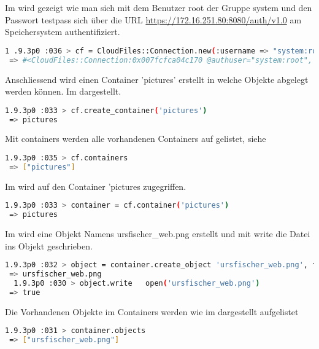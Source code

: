 Im  wird gezeigt wie man sich mit dem Benutzer root der Gruppe system und den Passwort testpass sich über die URL \url{https://172.16.251.80:8080/auth/v1.0} am Speichersystem authentifiziert.

\begin{lstlisting}[label=logon, language=Bash, caption=Anmelden an Speichersystem] 
 1 .9.3p0 :036 > cf = CloudFiles::Connection.new(:username => "system:root", :api_key => "testpass", :auth_url => "https://172.16.251.80:8080/auth/v1.0")
 => #<CloudFiles::Connection:0x007fcfca04c170 @authuser="system:root", @authkey="testpass", @auth_url="https://172.16.251.80:8080/auth/v1.0", @retry_auth=true, @snet=nil, @proxy_host=nil, @proxy_port=nil, @authok=true, @http={}, @storagehost="172.16.251.80", @storagepath="/v1/AUTH_system", @storageport=8080, @storagescheme="https", @authtoken="AUTH_tk4bc3d45cef364606ad521708101ad574"> 
\end{lstlisting}

Anschliessend wird einen Container 'pictures' erstellt in welche Objekte abgelegt werden können. Im  dargestellt.

\begin{lstlisting}[label=create_container, language=Bash, caption=Server bzw. Speicher den Ringen hinzufügen]
1.9.3p0 :033 > cf.create_container('pictures')
 => pictures
\end{lstlisting}

Mit containers werden alle vorhandenen Containers auf gelistet, siehe 
\begin{lstlisting}[label=list_contaners, language=Bash, caption=Auflisten der Vorhandenen Containers]
1.9.3p0 :035 > cf.containers
 => ["pictures"] 
\end{lstlisting}

Im  wird auf den Container 'pictures zugegriffen.
\begin{lstlisting}[label=access_container, language=Bash, caption=Zugreifen auf den Container]
1.9.3p0 :033 > container = cf.container('pictures')
 => pictures 
 \end{lstlisting}

Im  wird eine Objekt Namens ursfischer\_web.png erstellt und mit write die Datei ins Objekt geschrieben.

\begin{lstlisting}[label=create_object, language=Bash, caption=Erstellt ein Object und schreibt den Inhalt ins Objekt] 
  1.9.3p0 :032 > object = container.create_object 'ursfischer_web.png', false
 => ursfischer_web.png
  1.9.3p0 :030 > object.write   open('ursfischer_web.png')
 => true  
\end{lstlisting}

Die Vorhandenen Objekte im Containers werden wie im  dargestellt aufgelistet

\begin{lstlisting}[label=list_objects, language=Bash, caption=Objekte des Containers auflisten]
 1.9.3p0 :031 > container.objects
 => ["ursfischer_web.png"] 
\end{lstlisting} 